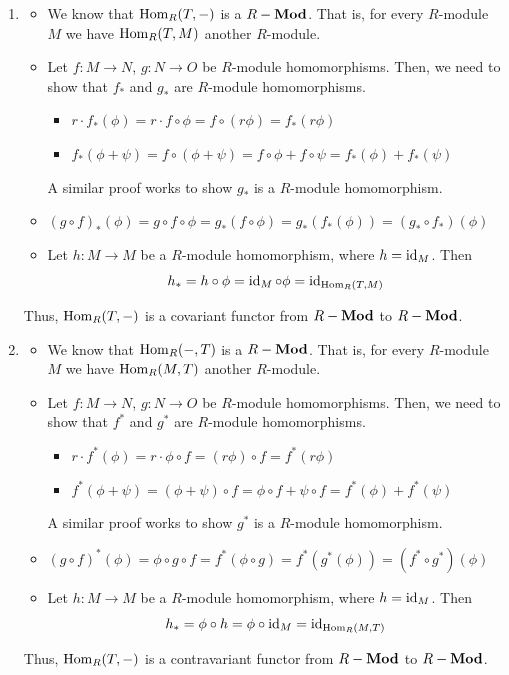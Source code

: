 \documentclass[Notebook.tex]{subfiles}
\begin{document}
\begin{solution}
    \bbni
    \begin{enumerate}
        \item \begin{itemize}
            \item We know that $\operatorname{Hom}_R(T, -)$ is a $R-\operatorname{\textbf{Mod}}$. That is, for every $R$-module $M$ we have $\operatorname{Hom}_R(T, M)$ another $R$-module. 
            \item Let $f: M \to N$, $g: N \to O$ be $R$-module homomorphisms. Then, we need to show that $f_*$ and $g_*$ are $R$-module homomorphisms. 
            \begin{itemize}
                \item $r \cdot f_*(\phi) = r \cdot f \circ \phi = f \circ (r\phi) = f_*(r\phi)$
                \item $ f_*(\phi + \psi) =  f \circ (\phi + \psi) = f \circ \phi + f \circ \psi = f_*(\phi ) + f_*( \psi)$
            \end{itemize}
            A similar proof works to show $g_*$ is a $R$-module homomorphism. 
            \item $(g \circ f)_* (\phi) = g \circ f \circ \phi = g_*(f \circ \phi) = g_*(f_*(\phi)) = (g_* \circ f_*)(\phi) $
            \item Let $h: M \to M$ be a $R$-module homomorphism, where $h = \operatorname{id}_M$. Then 
            \[h_* = h \circ \phi = \operatorname{id}_M \circ \phi = \operatorname{id}_{\operatorname{Hom}_R(T, M)}\]
        \end{itemize}
        Thus, $\operatorname{Hom}_R(T, -)$ is a covariant functor from $R-\operatorname{\textbf{Mod}}$ to $R-\operatorname{\textbf{Mod}}$. 

        \item \begin{itemize}
            \item We know that $\operatorname{Hom}_R( -, T)$ is a $R-\operatorname{\textbf{Mod}}$. That is, for every $R$-module $M$ we have $\operatorname{Hom}_R( M, T)$ another $R$-module. 
            \item Let $f: M \to N$, $g: N \to O$ be $R$-module homomorphisms. Then, we need to show that $f^*$ and $g^*$ are $R$-module homomorphisms. 
            \begin{itemize}
                \item $r \cdot f^*(\phi) = r \cdot  \phi \circ f =  (r\phi) \circ f = f^*(r\phi)$
                \item $ f^*(\phi + \psi) =   (\phi + \psi)  \circ f=  \phi \circ f + \psi  \circ f= f^*(\phi ) + f^*( \psi)$
            \end{itemize}
            A similar proof works to show $g^*$ is a $R$-module homomorphism. 
            \item $(g \circ f)^* (\phi) =\phi \circ  g \circ f = f^*( \phi \circ g) = f^*(g^*(\phi)) = (f^* \circ g^*)(\phi) $
            \item Let $h: M \to M$ be a $R$-module homomorphism, where $h = \operatorname{id}_M$. Then 
            \[h_* = \phi \circ h =  \phi \circ \operatorname{id}_M = \operatorname{id}_{\operatorname{Hom}_R(M, T)}\]
        \end{itemize}
        Thus, $\operatorname{Hom}_R(T, -)$ is a contravariant functor from $R-\operatorname{\textbf{Mod}}$ to $R-\operatorname{\textbf{Mod}}$. 
        

\end{enumerate}
\end{solution}
\end{document}
